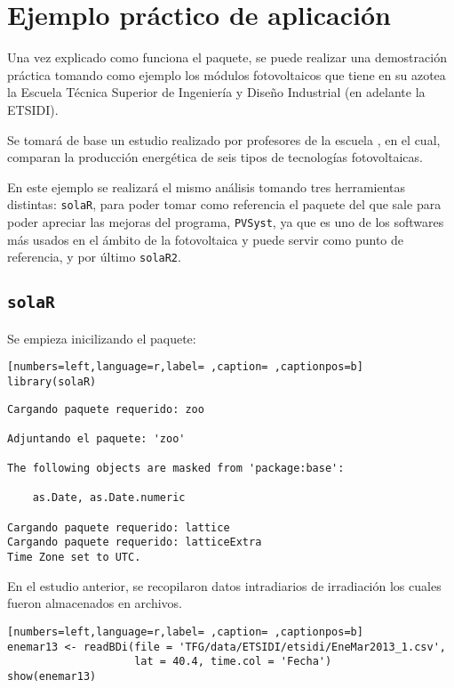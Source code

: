 \chapter{Ejemplo práctico de aplicación}
\label{chap:ejemplo-practico-aplicacion}
Una vez explicado como funciona el paquete, se puede realizar una demostración práctica tomando como ejemplo los módulos fotovoltaicos que tiene en su azotea la Escuela Técnica Superior de Ingeniería y Diseño Industrial (en adelante la ETSIDI).

Se tomará de base un estudio realizado por profesores de la escuela \cite{adrada17}, en el cual, comparan la producción energética de seis tipos de tecnologías fotovoltaicas.

En este ejemplo se realizará el mismo análisis tomando tres herramientas distintas: \texttt{solaR}, para poder tomar como referencia el paquete del que sale para poder apreciar las mejoras del programa, \texttt{PVSyst}, ya que es uno de los softwares más usados en el ámbito de la fotovoltaica y puede servir como punto de referencia, y por último \texttt{solaR2}.

\section{\texttt{solaR}}
\label{sec:org28bb0be}
\label{sec:solaR}
Se empieza inicilizando el paquete:
\begin{lstlisting}[numbers=left,language=r,label= ,caption= ,captionpos=b]
library(solaR)
\end{lstlisting}

\begin{verbatim}
Cargando paquete requerido: zoo

Adjuntando el paquete: 'zoo'

The following objects are masked from 'package:base':

    as.Date, as.Date.numeric

Cargando paquete requerido: lattice
Cargando paquete requerido: latticeExtra
Time Zone set to UTC.
\end{verbatim}

En el estudio anterior, se recopilaron datos intradiarios de irradiación los cuales fueron almacenados en archivos.
\begin{lstlisting}[numbers=left,language=r,label= ,caption= ,captionpos=b]
enemar13 <- readBDi(file = 'TFG/data/ETSIDI/etsidi/EneMar2013_1.csv',
                    lat = 40.4, time.col = 'Fecha')
show(enemar13)
\end{lstlisting}

